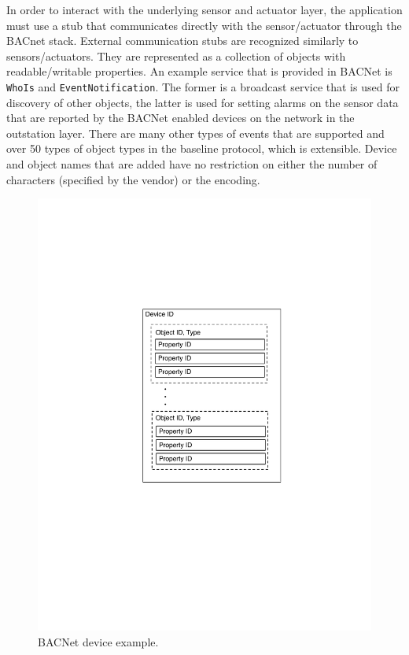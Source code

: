 In order to interact with the underlying sensor and actuator layer, the application must use a stub that communicates directly with the 
sensor/actuator through the BACnet stack.  External communication stubs are recognized similarly to sensors/actuators.  They are represented 
as a collection of 
objects with readable/writable properties.  An example service that is provided in BACNet is  \texttt{WhoIs} and \texttt{EventNotification}.
The former is a broadcast service that is used for discovery of other objects, the latter is used for setting alarms on the sensor data that
are reported by the BACNet enabled devices on the network in the outstation layer.  There are many other types of events that are supported 
and over 50 types of object types in the baseline protocol, which is extensible.  Device and object names that are added have no restriction
on either the number of characters (specified by the vendor) or the encoding.


\begin{figure}[t!] %
\centering
\includegraphics[width=0.25\columnwidth]{figs/bacnet_device}
\caption{BACNet device example.}
\label{fig:bacnet_device}
\end{figure}